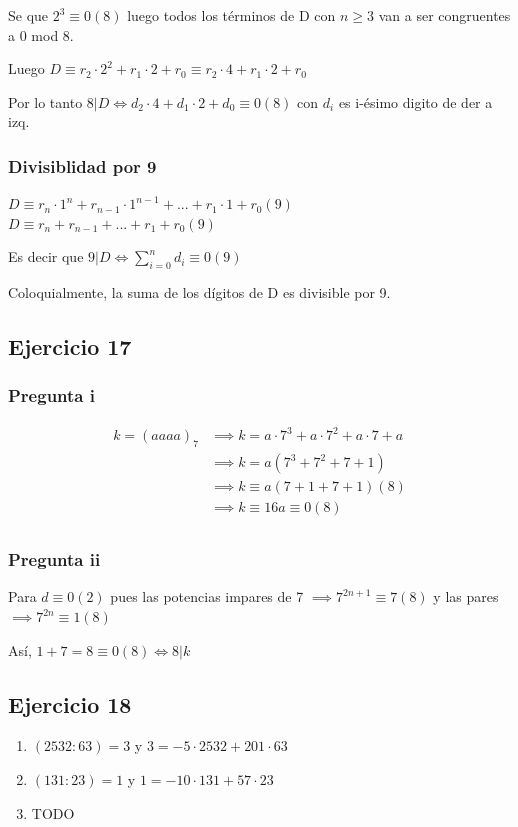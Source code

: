 Se que $ 2^3 \equiv 0 (8) $ luego todos los términos de D con $ n \geq 3 $ van a ser congruentes a 0 mod 8.

Luego $ D \equiv r_2 \cdot 2^2 + r_1 \cdot 2 + r_0 \equiv r_2 \cdot 4 + r_1 \cdot 2 + r_0 $

Por lo tanto $ 8|D \iff d_2 \cdot 4 + d_1 \cdot 2 + d_0 \equiv 0(8) $ con $d_i$ es i-ésimo digito de der a izq.

\subsubsection{Divisiblidad por 9}
$ D \equiv r_n \cdot 1^n + r_{n-1}\cdot 1^{n-1}+...+r_1 \cdot 1 + r_0 (9)$ \\
$ D \equiv r_n + r_{n-1} +...+ r_1 + r_0 (9)$

Es decir que $ 9|D \iff \sum_{i=0}^{n}d_i \equiv 0(9)$

Coloquialmente, la suma de los dígitos de D es divisible por 9.

\subsection{Ejercicio 17}
\subsubsection{Pregunta i}
\begin{align*}
    k = (aaaa)_7 &\implies k = a\cdot 7^3 + a\cdot 7^2 + a \cdot 7 + a \\
    &\implies k = a(7^3+7^2+7+1) \\
    &\implies k \equiv a(7+1+7+1)(8) \\
    &\implies k \equiv 16a \equiv 0(8) \\
\end{align*}

\subsubsection{Pregunta ii}
Para $ d \equiv 0 (2) $ pues las potencias impares de 7 $ \implies 7^{2n+1}\equiv 7 (8) $ y las pares $ \implies 7^{2n}\equiv 1 (8) $

Así, $ 1+7= 8 \equiv 0(8) \iff 8|k $

\subsection{Ejercicio 18}
\begin{enumerate}
    \item $ (2532:63) = 3 $ y $ 3 = -5 \cdot 2532 + 201 \cdot 63$
    \item $ (131:23) = 1 $ y $ 1 = -10 \cdot 131 + 57 \cdot 23$
    \item TODO
\end{enumerate}

